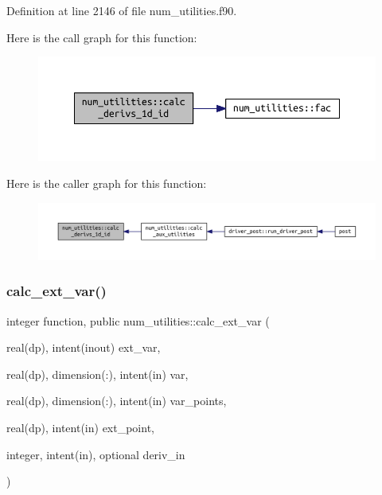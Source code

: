Definition at line 2146 of file num\+\_\+utilities.\+f90.

Here is the call graph for this function\+:\nopagebreak
\begin{figure}[H]
\begin{center}
\leavevmode
\includegraphics[width=350pt]{namespacenum__utilities_af2e9ffd7ce2f9391bf8b6f1c344fabca_cgraph}
\end{center}
\end{figure}
Here is the caller graph for this function\+:\nopagebreak
\begin{figure}[H]
\begin{center}
\leavevmode
\includegraphics[width=350pt]{namespacenum__utilities_af2e9ffd7ce2f9391bf8b6f1c344fabca_icgraph}
\end{center}
\end{figure}
\mbox{\label{namespacenum__utilities_a2d5d9c66db19fb6edeeb50db6182397f}} 
\subsubsection{\texorpdfstring{calc\+\_\+ext\+\_\+var()}{calc\_ext\_var()}}
{\footnotesize\ttfamily integer function, public num\+\_\+utilities\+::calc\+\_\+ext\+\_\+var (\begin{DoxyParamCaption}\item[{real(dp), intent(inout)}]{ext\+\_\+var,  }\item[{real(dp), dimension(\+:), intent(in)}]{var,  }\item[{real(dp), dimension(\+:), intent(in)}]{var\+\_\+points,  }\item[{real(dp), intent(in)}]{ext\+\_\+point,  }\item[{integer, intent(in), optional}]{deriv\+\_\+in }\end{DoxyParamCaption})}



